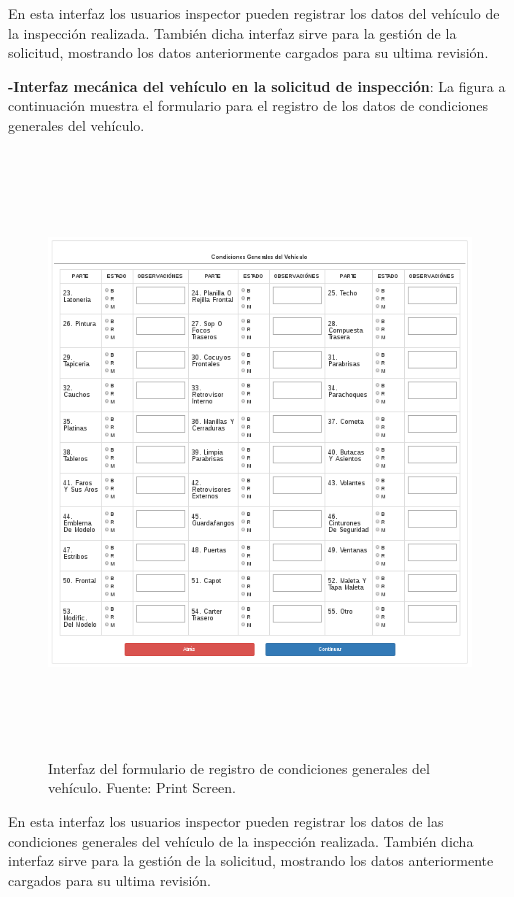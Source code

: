 En esta interfaz los usuarios inspector pueden registrar los datos del vehículo de la inspección realizada. También dicha interfaz sirve para la gestión de la solicitud, mostrando los datos anteriormente cargados para su ultima revisión.


\textbf{-Interfaz mecánica del vehículo en la solicitud de inspección}: La figura a continuación muestra el formulario para el registro de los datos de condiciones generales del vehículo.

\begin{figure}[H]
\begin{center}
	\includegraphics[width=\textwidth,height=16cm]{img/interfaces/registro_condiciones_generales_vehiculo.png}
\end{center}
\caption{Interfaz del formulario de registro de condiciones generales del vehículo. Fuente: Print Screen.}
\label{fig:interfaz_registro_condiciones_vehiculo}
\end{figure}

En esta interfaz los usuarios inspector pueden registrar los datos de las condiciones generales del vehículo de la inspección realizada. También dicha interfaz sirve para la gestión de la solicitud, mostrando los datos anteriormente cargados para su ultima revisión.


